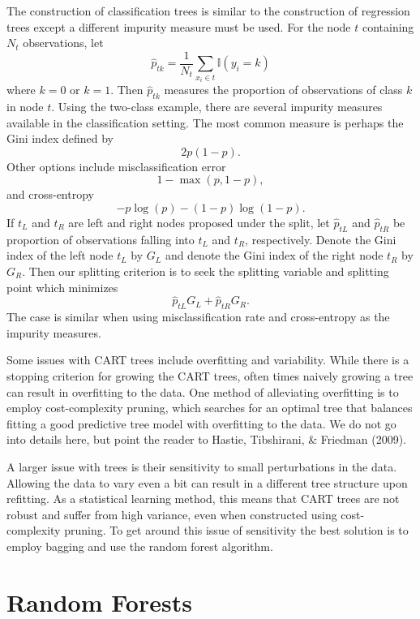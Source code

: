 \documentclass[12pt,twoside]{reedthesis}
\theoremstyle{definition}
\theoremstyle{definition}
\theoremstyle{definition}
\theoremstyle{remark}
\begin{document}
The construction of classification trees is similar to the construction
of regression trees except a different impurity measure must be used.
For the node \(t\) containing \(N_t\) observations, let
\[\hat{p}_{tk}=\frac{1}{N_t}\sum_{x_i\in t} \mathbb{I}(y_i=k)\] where
\(k=0\) or \(k=1\). Then \(\hat{p}_{tk}\) measures the proportion of
observations of class \(k\) in node \(t\). Using the two-class example,
there are several impurity measures available in the classification
setting. The most common measure is perhaps the Gini index defined by
\[2p(1-p).\] Other options include misclassification error
\[1-\max(p,1-p),\] and cross-entropy \[-p\log(p)-(1-p)\log(1-p).\] If
\(t_L\) and \(t_R\) are left and right nodes proposed under the split,
let \(\hat{p}_{tL}\) and \(\hat{p}_{tR}\) be proportion of observations
falling into \(t_L\) and \(t_R\), respectively. Denote the Gini index of
the left node \(t_L\) by \(G_{L}\) and denote the Gini index of the
right node \(t_R\) by \(G_{R}\). Then our splitting criterion is to seek
the splitting variable and splitting point which minimizes
\[\hat{p}_{tL}G_L+\hat{p}_{tR}G_R.\] The case is similar when using
misclassification rate and cross-entropy as the impurity measures. \par

Some issues with CART trees include overfitting and variability. While
there is a stopping criterion for growing the CART trees, often times
naively growing a tree can result in overfitting to the data. One method
of alleviating overfitting is to employ cost-complexity pruning, which
searches for an optimal tree that balances fitting a good predictive
tree model with overfitting to the data. We do not go into details here,
but point the reader to Hastie, Tibshirani, \& Friedman (2009). \par

A larger issue with trees is their sensitivity to small perturbations in
the data. Allowing the data to vary even a bit can result in a different
tree structure upon refitting. As a statistical learning method, this
means that CART trees are not robust and suffer from high variance, even
when constructed using cost-complexity pruning. To get around this issue
of sensitivity the best solution is to employ bagging and use the random
forest algorithm. \par

\section{Random Forests}\label{random-forests}
\end{document}
